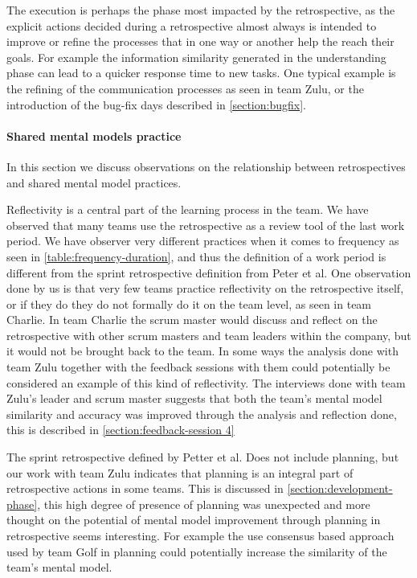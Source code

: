 The execution is perhaps the phase most impacted by the retrospective, as the explicit actions decided during a retrospective almost always is intended to improve or refine the processes that in one way or another help the reach their goals. For example the information similarity generated in the understanding phase can lead to a quicker response time to new tasks. One typical example is the refining of the communication processes as seen in team Zulu, or the introduction of the bug-fix days described in \autoref{section:bugfix}. 

\paragraph{Shared mental models practice}
In this section we discuss observations on the relationship between retrospectives and shared mental model practices.


Reflectivity is a central part of the learning process in the team. We have observed that many teams use the retrospective as a review tool of the last work period. We have observer very different practices when it comes to frequency as seen in \autoref{table:frequency-duration}, and thus the definition of a work period is different from the sprint retrospective definition from Peter et al. One observation done by us is that very few teams practice reflectivity on the retrospective itself, or if they do they do not formally do it on the team level, as seen in team Charlie. In team Charlie the scrum master would discuss and reflect on the retrospective with other scrum masters and team leaders within the company, but it would not be brought back to the team. In some ways the analysis done with team Zulu together with the feedback sessions with them could potentially be considered an example of this kind of reflectivity. The interviews done with team Zulu's leader and scrum master suggests that both the team's mental model similarity and accuracy was improved through the analysis and reflection done, this is described in \autoref{section:feedback-session 4}

The sprint retrospective defined by Petter et al. Does not include planning, but our work with team Zulu indicates that planning is an integral part of retrospective actions in some teams. This is discussed in \autoref{section:development-phase}, this high degree of presence of planning was unexpected and more thought on the potential of mental model improvement through planning in retrospective seems interesting. For example the use consensus based approach used by team Golf in planning could potentially increase the similarity of the team's mental model.

